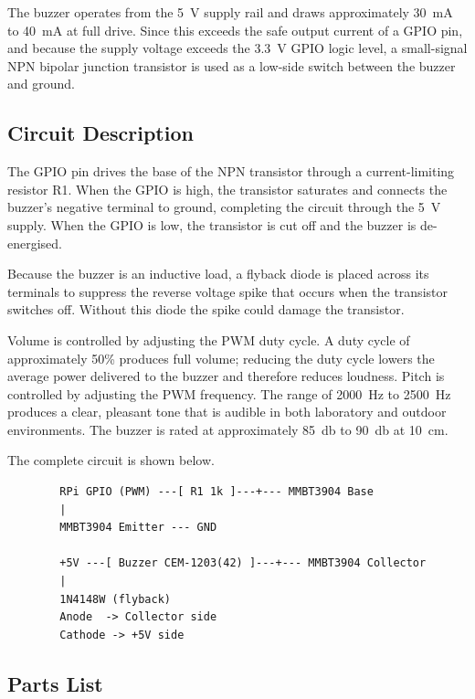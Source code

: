 \documentclass[12pt,letterpaper]{article}
\begin{document}
	The buzzer operates from the \SI{5}{\volt} supply rail and draws approximately
	\SI{30}{\milli\ampere} to \SI{40}{\milli\ampere} at full drive. Since this exceeds the
	safe output current of a GPIO pin, and because the supply voltage exceeds the
	\SI{3.3}{\volt} GPIO logic level, a small-signal NPN bipolar junction transistor is
	used as a low-side switch between the buzzer and ground.
	
	\subsection{Circuit Description}
	
	The GPIO pin drives the base of the NPN transistor through a current-limiting resistor
	R1. When the GPIO is high, the transistor saturates and connects the buzzer's negative
	terminal to ground, completing the circuit through the \SI{5}{\volt} supply. When the
	GPIO is low, the transistor is cut off and the buzzer is de-energised.
	
	Because the buzzer is an inductive load, a flyback diode is placed across its terminals
	to suppress the reverse voltage spike that occurs when the transistor switches off.
	Without this diode the spike could damage the transistor.
	
	Volume is controlled by adjusting the PWM duty cycle. A duty cycle of approximately
	50\% produces full volume; reducing the duty cycle lowers the average power delivered
	to the buzzer and therefore reduces loudness. Pitch is controlled by adjusting the PWM
	frequency. The range of \SI{2000}{\hertz} to \SI{2500}{\hertz} produces a clear,
	pleasant tone that is audible in both laboratory and outdoor environments. The buzzer
	is rated at approximately \SI{85}{\decibel} to \SI{90}{\decibel} at \SI{10}{\centi\meter}.
	
	The complete circuit is shown below.
	
	\begin{verbatim}
		RPi GPIO (PWM) ---[ R1 1k ]---+--- MMBT3904 Base
		|
		MMBT3904 Emitter --- GND
		
		+5V ---[ Buzzer CEM-1203(42) ]---+--- MMBT3904 Collector
		|
		1N4148W (flyback)
		Anode  -> Collector side
		Cathode -> +5V side
	\end{verbatim}
	
	\subsection{Parts List}
	
\end{document}
